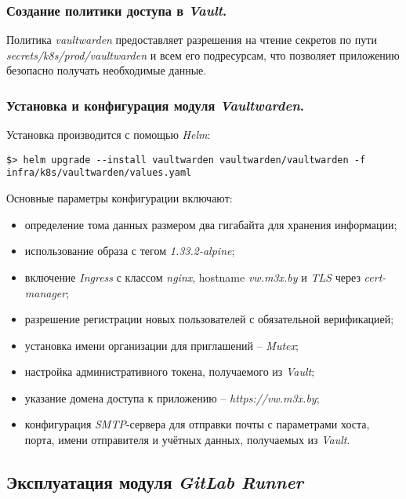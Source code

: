 \subsubsection{Создание политики доступа в \textit{Vault}.} Политика \textit{vaultwarden} предоставляет разрешения на чтение секретов по пути \textit{secrets/k8s/prod/vaultwarden} и всем его подресурсам, что позволяет приложению безопасно получать необходимые данные.

\subsubsection{Установка и конфигурация модуля \textit{Vaultwarden}.} Установка производится с помощью \textit{Helm}:

\begin{lstlisting}
$> helm upgrade --install vaultwarden vaultwarden/vaultwarden -f infra/k8s/vaultwarden/values.yaml
\end{lstlisting}

Основные параметры конфигурации включают:

\begin{itemize}
    \item определение тома данных размером два гигабайта для хранения информации;
    \item использование образа с тегом \textit{1.33.2-alpine};
    \item включение \textit{Ingress} с классом \textit{nginx}, hostname \textit{vw.m3x.by} и \textit{TLS} через \textit{cert-manager};
    \item разрешение регистрации новых пользователей с обязательной верификацией;
    \item установка имени организации для приглашений -- \textit{Mutex};
    \item настройка административного токена, получаемого из \textit{Vault};
    \item указание домена доступа к приложению -- \textit{https://vw.m3x.by};
    \item конфигурация \textit{SMTP}-сервера для отправки почты с параметрами хоста, порта, имени отправителя и учётных данных, получаемых из \textit{Vault}.
\end{itemize}



\subsection{Эксплуатация модуля \textit{GitLab Runner}}

